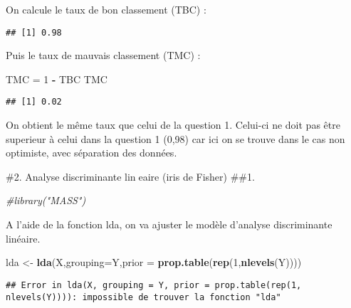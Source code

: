 \documentclass[
]{article}
\newenvironment{Shaded}{\begin{snugshade}}{\end{snugshade}}
\newcommand{\CommentTok}[1]{\textcolor[rgb]{0.56,0.35,0.01}{\textit{#1}}}
\newcommand{\DataTypeTok}[1]{\textcolor[rgb]{0.13,0.29,0.53}{#1}}
\newcommand{\DecValTok}[1]{\textcolor[rgb]{0.00,0.00,0.81}{#1}}
\newcommand{\KeywordTok}[1]{\textcolor[rgb]{0.13,0.29,0.53}{\textbf{#1}}}
\newcommand{\NormalTok}[1]{#1}
\newcommand{\OperatorTok}[1]{\textcolor[rgb]{0.81,0.36,0.00}{\textbf{#1}}}
\newcommand{\StringTok}[1]{\textcolor[rgb]{0.31,0.60,0.02}{#1}}
\begin{document}
On calcule le taux de bon classement (TBC) :

\begin{Shaded}
\end{Shaded}

\begin{verbatim}
## [1] 0.98
\end{verbatim}

Puis le taux de mauvais classement (TMC) :

\begin{Shaded}
\begin{Highlighting}[]
\NormalTok{TMC =}\StringTok{ }\DecValTok{1} \OperatorTok{-}\StringTok{ }\NormalTok{TBC}
\NormalTok{TMC}
\end{Highlighting}
\end{Shaded}

\begin{verbatim}
## [1] 0.02
\end{verbatim}

On obtient le même taux que celui de la question 1. Celui-ci ne doit pas
être superieur à celui dans la question 1 (0,98) car ici on se trouve
dans le cas non optimiste, avec séparation des données.

\#2. Analyse discriminante lineaire (iris de Fisher) \#\#1.

\begin{Shaded}
\begin{Highlighting}[]
\CommentTok{#library("MASS")}
\end{Highlighting}
\end{Shaded}

A l'aide de la fonction lda, on va ajuster le modèle d'analyse
discriminante linéaire.

\begin{Shaded}
\begin{Highlighting}[]
\NormalTok{lda <-}\StringTok{ }\KeywordTok{lda}\NormalTok{(X,}\DataTypeTok{grouping=}\NormalTok{Y,}\DataTypeTok{prior =} \KeywordTok{prop.table}\NormalTok{(}\KeywordTok{rep}\NormalTok{(}\DecValTok{1}\NormalTok{,}\KeywordTok{nlevels}\NormalTok{(Y))))}
\end{Highlighting}
\end{Shaded}

\begin{verbatim}
## Error in lda(X, grouping = Y, prior = prop.table(rep(1, nlevels(Y)))): impossible de trouver la fonction "lda"
\end{verbatim}
\end{document}
